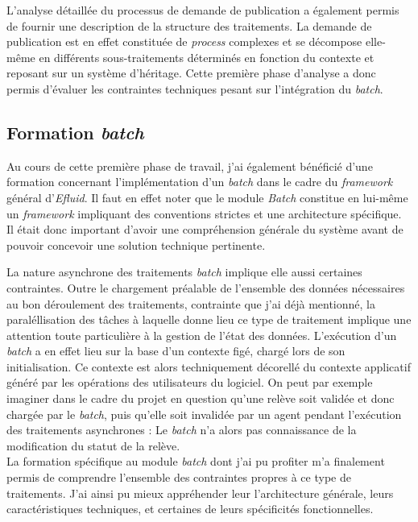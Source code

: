 \documentclass[a4paper, 12pt]{report}
\begin{document}
L'analyse détaillée du processus de demande de publication a également permis de fournir une description de la structure des traitements. La demande de publication est en effet constituée de \textit{process} complexes et se décompose elle-même en différents sous-traitements déterminés en fonction du contexte et reposant sur un système d'héritage. Cette première phase d'analyse a donc permis d'évaluer les contraintes techniques pesant sur l'intégration du \textit{batch}.

\subsection{Formation \textit{batch}}

Au cours de cette première phase de travail, j'ai également bénéficié d'une formation concernant l'implémentation d'un \textit{batch} dans le cadre du \textit{framework} général d'\textit{Efluid}. Il faut en effet noter que le module \textit{Batch} constitue en lui-même un \textit{framework} impliquant des conventions strictes et une architecture spécifique. Il était donc important d'avoir une compréhension générale du système avant de pouvoir concevoir une solution technique pertinente.

La nature asynchrone des traitements \textit{batch} implique elle aussi certaines contraintes. Outre le chargement préalable de l'ensemble des données nécessaires au bon déroulement des traitements, contrainte que j'ai déjà mentionné, la paraléllisation des tâches à laquelle donne lieu ce type de traitement implique une attention toute particulière à la gestion de l'état des données. L'exécution d'un \textit{batch} a en effet lieu sur la base d'un contexte figé, chargé lors de son initialisation. Ce contexte est alors techniquement décorellé du contexte applicatif généré par les opérations des utilisateurs du logiciel. On peut par exemple imaginer dans le cadre du projet en question qu'une relève soit validée et donc chargée par le \textit{batch}, puis qu'elle soit invalidée par un agent pendant l'exécution des traitements asynchrones : Le \textit{batch} n'a alors pas connaissance de la modification du statut de la relève.\\

La formation spécifique au module \textit{batch} dont j'ai pu profiter m'a finalement permis de comprendre l'ensemble des contraintes propres à ce type de traitements. J'ai ainsi pu mieux appréhender leur l'architecture générale, leurs caractéristiques techniques, et certaines de leurs spécificités fonctionnelles.
\end{document}
